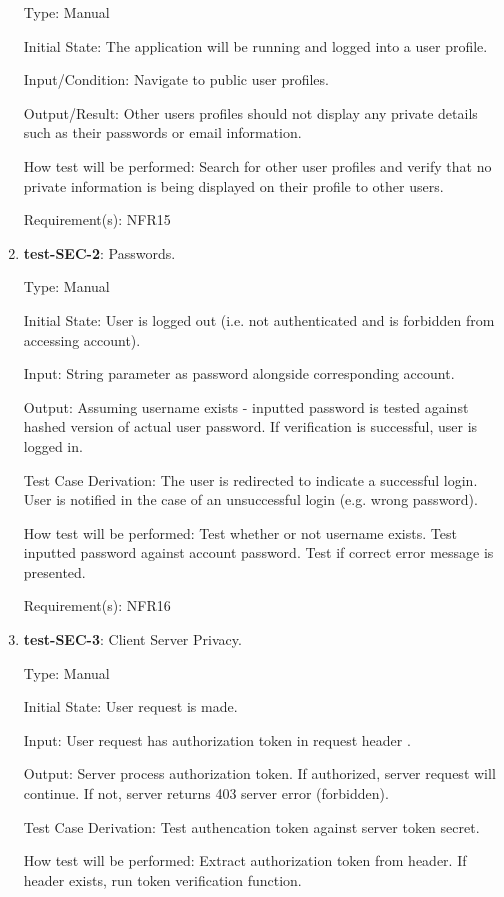 \documentclass[12pt, titlepage]{article}
\begin{document}
\begin{enumerate}
		Type: Manual
		
		Initial State: The application will be running and logged into a user profile. 
		
		Input/Condition: Navigate to public user profiles.
		
		Output/Result: Other users profiles should not display any private details such as their passwords or email information. 
		
		How test will be performed: Search for other user profiles and verify that no private information is being displayed on their profile to other users.
		
		Requirement(s): NFR15
		
		\item{\textbf{test-SEC-2}}: Passwords.
		
		Type: Manual 
		
		Initial State: User is logged out (i.e. not authenticated and is forbidden from accessing account).
		
		Input: String parameter as password alongside corresponding account.
		
		Output: Assuming username exists - inputted password is tested against hashed version of actual user password. If verification is successful, user is logged in. 
		
		Test Case Derivation: The user is redirected to indicate a successful login. User is notified in the case of an unsuccessful login (e.g. wrong password).
		
		How test will be performed: Test whether or not username exists. Test inputted password against account password. Test if correct error message is presented.
		
		Requirement(s): NFR16
		
		\item{\textbf{test-SEC-3}}: Client Server Privacy.
		
		Type: Manual 
		
		Initial State: User request is made.
		
		Input: User request has authorization token in request header .
		
		Output: Server process authorization token. If authorized, server request will continue. If not, server returns 403 server error (forbidden).
		
		Test Case Derivation: Test authencation token against server token secret. 
		
		How test will be performed: Extract authorization token from header. If header exists, run token verification function.
	

\end{enumerate}
\end{document}
